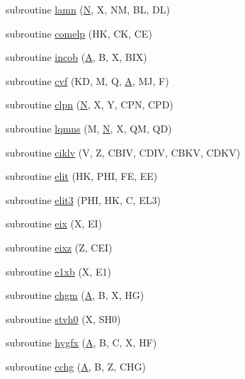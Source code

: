 \begin{DoxyCompactItemize}
\item 
subroutine \hyperlink{specfun_8f_a634aa162f4e9c254950b89eab4a42aac}{lamn} (\hyperlink{polmisc_8c_a0240ac851181b84ac374872dc5434ee4}{N}, X, N\+M, B\+L, D\+L)
\item 
subroutine \hyperlink{specfun_8f_a5163f48592b4ffd64c120b0cc401e039}{comelp} (H\+K, C\+K, C\+E)
\item 
subroutine \hyperlink{specfun_8f_a2efcde527a1db1738c97a269697a4a82}{incob} (\hyperlink{classA}{A}, B, X, B\+I\+X)
\item 
subroutine \hyperlink{specfun_8f_a34b3f4a6ebde1fc9909e3f2c2d76252d}{cvf} (K\+D, M, Q, \hyperlink{classA}{A}, M\+J, F)
\item 
subroutine \hyperlink{specfun_8f_af485d51b4f1323bd31cc8c129c769295}{clpn} (\hyperlink{polmisc_8c_a0240ac851181b84ac374872dc5434ee4}{N}, X, Y, C\+P\+N, C\+P\+D)
\item 
subroutine \hyperlink{specfun_8f_a6c15ea434188732aec78d0c213405a03}{lqmns} (M, \hyperlink{polmisc_8c_a0240ac851181b84ac374872dc5434ee4}{N}, X, Q\+M, Q\+D)
\item 
subroutine \hyperlink{specfun_8f_adc31b4d8f86e4fe214fbc41e8cc7ac9d}{ciklv} (V, Z, C\+B\+I\+V, C\+D\+I\+V, C\+B\+K\+V, C\+D\+K\+V)
\item 
subroutine \hyperlink{specfun_8f_afa81e6eaace43de87686bde56392888b}{elit} (H\+K, P\+H\+I, F\+E, E\+E)
\item 
subroutine \hyperlink{specfun_8f_a415e0ac19ffe4f6899cd78af04a9a658}{elit3} (P\+H\+I, H\+K, C, E\+L3)
\item 
subroutine \hyperlink{specfun_8f_a6fd5f374c0445418feb50ae20b29cd30}{eix} (X, E\+I)
\item 
subroutine \hyperlink{specfun_8f_adde3ddb3608c1eef4771f33074f9b375}{eixz} (Z, C\+E\+I)
\item 
subroutine \hyperlink{specfun_8f_afc6c64465d8c165e0ca8e4eec7c4c204}{e1xb} (X, E1)
\item 
subroutine \hyperlink{specfun_8f_a6f399797186b9829146c9f64593a5317}{chgm} (\hyperlink{classA}{A}, B, X, H\+G)
\item 
subroutine \hyperlink{specfun_8f_ab6c883bef9da6a07c631abf8d6b5874b}{stvh0} (X, S\+H0)
\item 
subroutine \hyperlink{specfun_8f_af7aa94a17500d23a204b0bc31f527b7c}{hygfx} (\hyperlink{classA}{A}, B, C, X, H\+F)
\item 
subroutine \hyperlink{specfun_8f_ab98f348d6aa9aae3ba0066c64958aea3}{cchg} (\hyperlink{classA}{A}, B, Z, C\+H\+G)
\item 

\end{DoxyCompactItemize}
